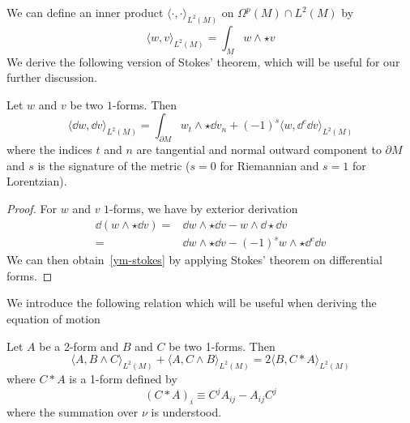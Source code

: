 %
We can define an inner product $\langle \cdot, \cdot \rangle_{L^2(M)}$ on $\Omega^p(M)\cap L^2(M)$ by
\begin{equation*}
\langle w, v \rangle_{L^2(M)} = \int_M w \wedge \star v
\end{equation*}
We derive the following version of Stokes' theorem, which will be useful for our further discussion.
\begin{proposition}
Let $w$ and $v$ be two $1$-forms. Then
\begin{equation}\label{ym-stokes}
\langle \dd w,  \dd v \rangle_{L^2(M)} =
\int_{\partial M} w_t\wedge \star \dd v_n  + (-1)^s
\langle w, \dd^c \dd v \rangle_{L^2(M)}
\end{equation}
where the indices $t$ and $n$ are tangential and normal outward component to $\partial M$ and $s$ is the signature of the metric ($s=0$ for Riemannian and $s = 1$ for Lorentzian).
\end{proposition}
%
\begin{proof}
For $w$ and $v$ $1$-forms, we have by exterior derivation 
\begin{equation*}
\begin{split}
\dd(w \wedge \star \dd v) = & \dd w \wedge \star \dd v - w \wedge \dd \star \dd v \\
= & \dd w \wedge  \star \dd v - (-1)^s w \wedge \star \dd^c \dd v
\end{split}
\end{equation*}
We can then obtain~\cref{ym-stokes} by applying Stokes' theorem on differential forms.
\end{proof}
We introduce the following relation which will be useful when deriving the equation of motion
\begin{proposition}\label{ym-wedge}
Let $A$ be a 2-form and $B$ and $C$ be two 1-forms. Then
\begin{equation}
\langle A, B\wedge C \rangle_{L^2(M)} + \langle A, C\wedge B \rangle_{L^2(M)} =
2 \langle B, C\ast A \rangle_{L^2(M)}
\end{equation}
where $C\ast A$ is a 1-form defined by
\begin{equation*}
(C\ast A)_{i} \equiv C^j A_{ij} - A_{ij}C^j
\end{equation*}
where the summation over $\nu$ is understood.
\end{proposition}
